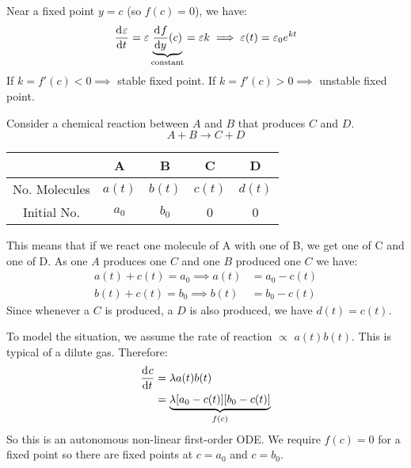 \documentclass[../main.tex]{subfiles}
\begin{document}
Near a fixed point $y = c$ (so $f(c) = 0$), we have:
\[
  \deriv{\varepsilon}{t} = \varepsilon \underbrace{\deriv{f}{y}(c)}_{\text{constant}} = \varepsilon k \implies
  \varepsilon(t) = \varepsilon_0 e^{kt}
\]
If $k = f'(c) < 0 \implies$ stable fixed point.
If $k = f'(c) > 0 \implies$ unstable fixed point.
\begin{example}
  Consider a chemical reaction between $A$ and $B$ that produces $C$ and $D$.
  \[
    A + B \longrightarrow C + D
  \]
  \begin{center}
  \begin{tabular}{c|c|c|c|c}
   & A & B & C & D \\
  \hline
  No. Molecules & $a(t)$ & $b(t)$ & $c(t)$ & $d(t)$ \\
  \hline
  Initial No. & $a_0$ & $b_0$ & 0 & 0
  \end{tabular}
  \end{center}
  This means that if we react one molecule of A with one of B, we get one of C and one of D.
  As one $A$ produces one $C$ and one $B$ produced one $C$ we have:
  \begin{align*}
    a(t) + c(t) = a_0 \implies a(t) &= a_0 - c(t) \\
    b(t) + c(t) = b_0 \implies b(t) &= b_0 - c(t)
  \end{align*}
  Since whenever a $C$ is produced, a $D$ is also produced, we have $d(t) = c(t)$.

  To model the situation, we assume the rate of reaction $\propto$ $a(t)b(t)$.
  This is typical of a dilute gas.
  Therefore:
  \begin{align*}
    \deriv{c}{t} &= \lambda a(t)b(t) \\
                 &= \underbrace{\lambda[a_0 - c(t)][b_0 - c(t)]}_{f(c)}
  \end{align*}
  So this is an autonomous non-linear first-order ODE.
  We require $f(c) = 0$ for a fixed point so there are fixed points at $c = a_0$ and $c = b_0$.
\end{example}
\end{document}

